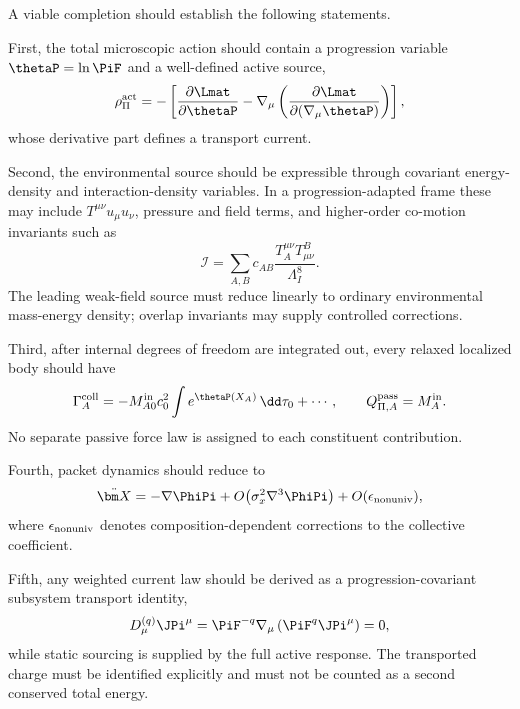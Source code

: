 \documentclass[12pt]{article}
\begin{document}
A viable completion should establish the following statements.

First, the total microscopic action should contain a progression variable \(\thetaP=\ln\PiF\) and a well-defined active source,
\begin{equation}
    \rho_\Pi^{\rm act}
    =-
    \left[
    \frac{\partial\Lmat}{\partial\thetaP}
    -\nabla_\mu\left(\frac{\partial\Lmat}{\partial(\nabla_\mu\thetaP)}\right)
    \right],
    \label{eq:minimal-active-source}
\end{equation}
whose derivative part defines a transport current.

Second, the environmental source should be expressible through covariant energy-density and interaction-density variables.  In a progression-adapted frame these may include \(T^{\mu\nu}u_\mu u_\nu\), pressure and field terms, and higher-order co-motion invariants such as
\begin{equation}
    \mathcal I=\sum_{A,B}c_{AB}\frac{T_A^{\mu\nu}T^B_{\mu\nu}}{\Lambda_I^8}.
    \label{eq:minimal-comotion-source}
\end{equation}
The leading weak-field source must reduce linearly to ordinary environmental mass-energy density; overlap invariants may supply controlled corrections.

Third, after internal degrees of freedom are integrated out, every relaxed localized body should have
\begin{equation}
    \Gamma_A^{\rm coll}
    =-M_{A0}^{\rm in}c_0^2\int e^{\thetaP(X_A)}\,\dd\tau_0+\cdots,
    \qquad
    Q_{\Pi,A}^{\rm pass}=M_A^{\rm in}.
    \label{eq:minimal-charge}
\end{equation}
No separate passive force law is assigned to each constituent contribution.

Fourth, packet dynamics should reduce to
\begin{equation}
    \ddot{\bm X}=-\nabla\PhiPi
    +O\!\left(\sigma_x^2\nabla^3\PhiPi\right)
    +O(\epsilon_{\rm nonuniv}),
    \label{eq:minimal-motion}
\end{equation}
where \(\epsilon_{\rm nonuniv}\) denotes composition-dependent corrections to the collective coefficient.

Fifth, any weighted current law should be derived as a progression-covariant subsystem transport identity,
\begin{equation}
    D_\mu^{(q)}\JPi^\mu
    =\PiF^{-q}\nabla_\mu\left(\PiF^q\JPi^\mu\right)=0,
    \label{eq:minimal-weighted}
\end{equation}
while static sourcing is supplied by the full active response.  The transported charge must be identified explicitly and must not be counted as a second conserved total energy.
\end{document}
